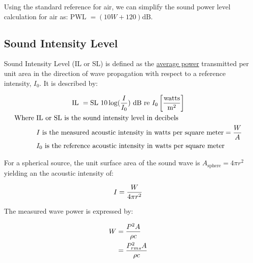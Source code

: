 
    Using the standard reference for air, we can simplify the sound power level calculation for air as: $\text{PWL } = (10W + 120) \text{dB}$.


    

    \subsection{Sound Intensity Level}
    Sound Intensity Level (IL or SL) is defined as the \underline{average power} transmitted per unit area in the direction of wave propagation with respect to a reference intensity, $I_0$.
    It is described by:

    \begin{gather} \labeq{il}
        \text{IL } = \text{SL } 10 \log(\frac{I}{I_0}) \text{ dB re } I_0 \left[\frac{\text{watts}}{\text{m}^2}\right] \\
        \begin{aligned}
            \text{Where }   & \text{IL or SL is the sound intensity level in decibels} \\
                            &I \text{ is the measured acoustic intensity in watts per square meter} = \frac{W}{A} \\
                            &I_0 \text{ is the reference acoustic intensity in watts per square meter} \\
        \end{aligned} \notag
    \end{gather}

    For a spherical source, the unit surface area of the sound wave is $A_{\text{sphere}} = 4\pi r^2$ yielding an the acoustic intensity of:

    \begin{equation} \labeq{i_sphere}
        I = \frac{W}{4\pi r^2}
    \end{equation}

    The measured wave power is expressed by:

    \begin{align} \labeq{sound_power}
        W &= \frac{P^2 A}{\rho c} \\
          &= \frac{P_{rms}^2 A}{\rho c}
    \end{align}

